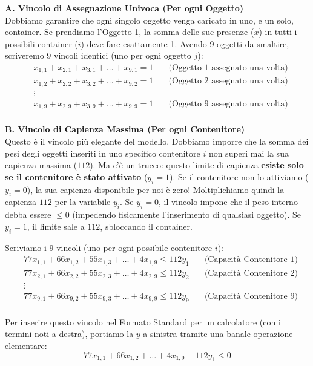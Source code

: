 \documentclass[12pt, a4paper]{article}
\begin{document}
	\textbf{A. Vincolo di Assegnazione Univoca (Per ogni Oggetto)}\\
	Dobbiamo garantire che ogni singolo oggetto venga caricato in uno, e un solo, container. Se prendiamo l'Oggetto 1, la somma delle sue presenze ($x$) in tutti i possibili container ($i$) deve fare esattamente 1. Avendo 9 oggetti da smaltire, scriveremo 9 vincoli identici (uno per ogni oggetto $j$):
	\[
	\begin{aligned}
		&x_{1,1} + x_{2,1} + x_{3,1} + \dots + x_{9,1} = 1 \quad &\text{(Oggetto 1 assegnato una volta)}\\
		&x_{1,2} + x_{2,2} + x_{3,2} + \dots + x_{9,2} = 1 \quad &\text{(Oggetto 2 assegnato una volta)}\\
		&\vdots \\
		&x_{1,9} + x_{2,9} + x_{3,9} + \dots + x_{9,9} = 1 \quad &\text{(Oggetto 9 assegnato una volta)}\\
	\end{aligned}
	\]
	
	\textbf{B. Vincolo di Capienza Massima (Per ogni Contenitore)}\\
	Questo è il vincolo più elegante del modello. Dobbiamo imporre che la somma dei pesi degli oggetti inseriti in uno specifico contenitore $i$ non superi mai la sua capienza massima ($112$). 
	Ma c'è un trucco: questo limite di capienza \textbf{esiste solo se il contenitore è stato attivato} ($y_i = 1$). Se il contenitore non lo attiviamo ($y_i = 0$), la sua capienza disponibile per noi è zero!
	Moltiplichiamo quindi la capienza $112$ per la variabile $y_i$. Se $y_i=0$, il vincolo impone che il peso interno debba essere $\leq 0$ (impedendo fisicamente l'inserimento di qualsiasi oggetto). Se $y_i=1$, il limite sale a $112$, sbloccando il container.
	
	Scriviamo i 9 vincoli (uno per ogni possibile contenitore $i$):
	\[
	\begin{aligned}
		&77x_{1,1} + 66x_{1,2} + 55x_{1,3} + \dots + 4x_{1,9} \leq 112y_1 \quad &\text{(Capacità Contenitore 1)}\\
		&77x_{2,1} + 66x_{2,2} + 55x_{2,3} + \dots + 4x_{2,9} \leq 112y_2 \quad &\text{(Capacità Contenitore 2)}\\
		&\vdots \\
		&77x_{9,1} + 66x_{9,2} + 55x_{9,3} + \dots + 4x_{9,9} \leq 112y_9 \quad &\text{(Capacità Contenitore 9)}\\
	\end{aligned}
	\]
	
	Per inserire questo vincolo nel Formato Standard per un calcolatore (con i termini noti a destra), portiamo la $y$ a sinistra tramite una banale operazione elementare:
	\[
	77x_{1,1} + 66x_{1,2} + \dots + 4x_{1,9} - 112y_1 \leq 0
	\]
	
\end{document}

